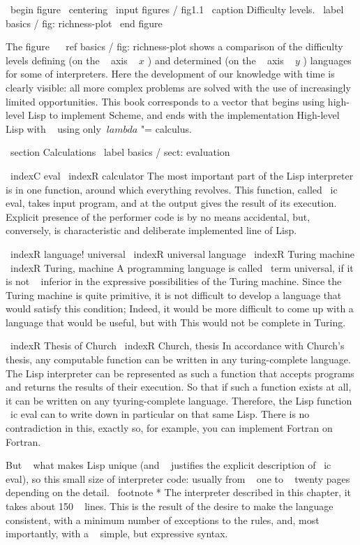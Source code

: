 \ begin {figure} \ centering
\ input {figures / fig1.1}
\ caption {Difficulty levels.} \ label {basics / fig: richness-plot}
\ end {figure}

The figure ~ \ ref {basics / fig: richness-plot} shows a comparison of the difficulty levels
defining (on the ~ axis ~ $ x $ ) and determined (on the ~ axis ~ $ y $ ) languages ​​for some of
interpreters. Here the development of our knowledge with time is clearly visible: all
more complex problems are solved with the use of increasingly limited
opportunities. This book corresponds to a vector that begins using
high-level Lisp to implement Scheme, and ends with the implementation
High-level Lisp with ~ using only $ \ lambda $ "= calculus.


\ section {Calculations} \ label {basics / sect: evaluation}

\ indexC {eval}
\ indexR {calculator}
The most important part of the Lisp interpreter is in one function, around which
everything revolves. This function, called \ ic {eval}, takes input
program, and at the output gives the result of its execution. Explicit presence of the performer
code is by no means accidental, but, conversely, is characteristic and deliberate
implemented line of Lisp.

\ indexR {language! universal}
\ indexR {universal language}
\ indexR {Turing machine} \ indexR {Turing, machine}
A programming language is called \ term {universal}, if it is not ~ inferior
in the expressive possibilities of the Turing machine. Since the Turing machine is quite
primitive, it is not difficult to develop a language that would satisfy this condition;
Indeed, it would be more difficult to come up with a language that would be useful, but with
This would not be complete in Turing.

\ indexR {Thesis of Church} \ indexR {Church, thesis}
In accordance with Church's thesis, any computable function can be written in
any turing-complete language. The Lisp interpreter can be represented as such
a function that accepts programs and returns the results of their execution. So
that if such a function exists at all, it can be written on any
tyuring-complete language. Therefore, the Lisp function \ ic {eval} can
to write down in particular on that same Lisp. There is no contradiction in this,
exactly so, for example, you can implement Fortran on Fortran.

But ~ what makes Lisp unique (and ~ justifies the explicit description of \ ic {eval}), so this
small size of interpreter code: usually from ~ one to ~ twenty pages
depending on the detail. \ footnote * {The interpreter described in this chapter,
it takes about 150 ~ lines.} This is the result of the desire to make the language consistent,
with a minimum number of exceptions to the rules, and, most importantly, with a ~ simple,
but expressive syntax.

